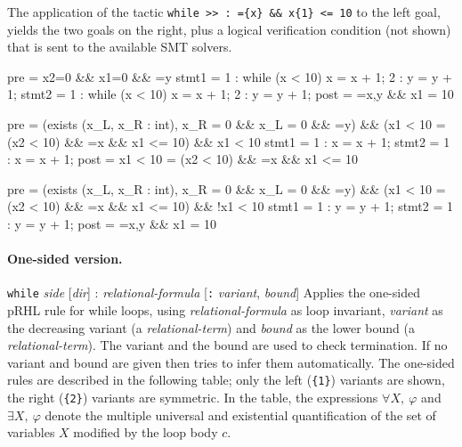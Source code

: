 \Example The application of the tactic
\verb+while >> : ={x} && x{1} <= 10+ to the left goal, yields
the two goals on the right, plus a
logical verification condition (not shown) that is sent to the available SMT solvers.\\

\begin{minicode}{0.4}
pre   = x{2}=0 && x{1}=0 && ={y}
stmt1 =   1 : while (x < 10) 
                x = x + 1;
          2 : y = y + 1;
stmt2 =   1 : while (x < 10) 
                x = x + 1;
          2 : y = y + 1;
post  = ={x,y} && x{1} = 10
\end{minicode}
\begin{minicode}{0.6}
pre   = (exists (x_L, x_R : int),  
          x_R = 0 && x_L = 0 && ={y}) &&
        (x{1} < 10 = (x{2} < 10) && 
        ={x} && x{1} <= 10) && x{1} < 10
stmt1 =   1 : x = x + 1;
stmt2 =   1 : x = x + 1;
post  = x{1} < 10 = (x{2} < 10) && 
        ={x} && x{1} <= 10


pre   = (exists (x_L, x_R : int),  
          x_R = 0 && x_L = 0 && ={y}) &&
        (x{1} < 10 = (x{2} < 10) && 
        ={x} && x{1} <= 10) && !x{1} < 10
stmt1 =   1 : y = y + 1;
stmt2 =   1 : y = y + 1;
post  = ={x,y} && x{1} = 10

\end{minicode}

\paragraph{One-sided version.}

\Syntax \verb+while+ \textit{side} [\textit{dir}] :
\textit{relational-formula} [\verb+:+ \textit{variant},
\textit{bound}] \Description Applies the one-sided pRHL rule for while
loops, using \textit{relational-formula} as loop invariant,
\textit{variant} as the decreasing variant (a
\textit{relational-term}) and \textit{bound} as the lower bound (a
\textit{relational-term}). The variant and the bound are used to check
termination.  If no variant and bound are given then \easycrypt tries
to infer them automatically.  The one-sided rules are described in the
following table; only the left (\verb+{1}+) variants are shown, the
right (\verb+{2}+) variants are symmetric. In the table, the
expressions $\forall X,~\varphi$ and $\exists X,~\varphi$ denote the
multiple universal and existential quantification of the set of
variables $X$ modified by the loop body $c$.

